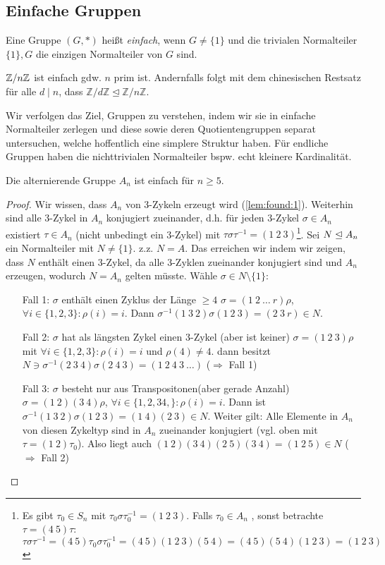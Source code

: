 \documentclass[../main.tex]{subfiles}
\begin{document}
\subsection{Einfache Gruppen}
\begin{definition}
Eine Gruppe $(G,*)$ heißt \emph{einfach}, wenn $G \neq \{1\}$ und die trivialen Normalteiler $\{1\}, G$ die einzigen Normalteiler von $G$ sind.
\end{definition}
\begin{example}
    $\mathbb{Z}/n\mathbb{Z}$ ist einfach gdw. $n$ prim ist. Andernfalls folgt mit dem chinesischen Restsatz für alle $d \mid n$, dass $\mathbb{Z}/d\mathbb{Z} \trianglelefteq \mathbb{Z}/n\mathbb{Z}$.
\end{example}
Wir verfolgen das Ziel, Gruppen zu verstehen, indem wir sie in einfache Normalteiler zerlegen und diese sowie deren Quotientengruppen separat untersuchen, welche hoffentlich eine simplere Struktur haben. Für endliche Gruppen haben die nichttrivialen Normalteiler bspw. echt kleinere Kardinalität.
\begin{theorem}[$A_5$]
Die alternierende Gruppe $A_n$ ist einfach für $n \geq 5$.
\end{theorem}
\begin{proof}
Wir wissen, dass $A_n$ von 3-Zykeln erzeugt wird (\cref{lem:found:1}).
Weiterhin sind alle 3-Zykel in $A_n$ konjugiert zueinander, d.h. für jeden 3-Zykel $\sigma \in A_n$ existiert $\tau \in A_n$ (nicht unbedingt ein 3-Zykel) mit $\tau\sigma\tau^{-1} = (1\ 2\ 3)$\footnote{Es gibt $\tau_0\in S_n$ mit $\tau_0\sigma\tau_0^{-1}=(1\ 2\ 3)$. Falls $\tau_0 \in A_n$ \checkmark, sonst betrachte $\tau = (4\ 5)\tau$: $\tau \sigma \tau^{-1} = (4\ 5)\tau_0\sigma\tau_0^{-1} =(4\ 5)(1\ 2\ 3)(5\ 4) = (4\ 5)(5\ 4)(1\ 2\ 3)=(1\ 2\ 3)$}.
Sei $N\trianglelefteq A_n$ ein Normalteiler mit $N\neq \{1\}$. z.z. $N=A$. Das erreichen wir indem wir zeigen, dass $N$ enthält einen $3$-Zykel, da alle $3$-Zyklen zueinander konjugiert sind und $A_n$ erzeugen, wodurch $N=A_n$ gelten müsste.
Wähle $\sigma \in N\setminus\{1\}$:
\begin{itemize}[font=\itshape,align= left]
    \item[Fall 1: $\sigma$ enthält einen Zyklus der Länge $\geq 4$] \obda $\sigma=(1\ 2\ \dots\ r) \rho$, $\forall i\in\{1,2,3\}:\rho(i)=i$. Dann $\sigma^{-1}(1\ 3\ 2)\sigma(1\ 2\ 3) = (2\ 3\ r)\in N$.
    \item[Fall 2: $\sigma$ hat als längsten Zykel einen 3-Zykel (aber ist keiner)] \obda $\sigma = (1\ 2\ 3)\rho$ mit $\forall i\in\{1,2,3\}:\rho(i)=i$ und $\rho(4)\neq 4$. dann besitzt $N\ni \sigma^{-1}(2\ 3\ 4)\sigma (2\ 4\ 3) = (1\ 2\ 4\ 3\ \dots)$ ($\Rightarrow$ Fall 1)
    \item[Fall 3: $\sigma$ besteht nur aus Transpositonen(aber gerade Anzahl)] \obda $\sigma = (1\ 2)(3\ 4)\rho$, $\forall i\in\{1,2,34,\}:\rho(i)=i$. Dann ist $\sigma^{-1}(1\ 3\ 2)\sigma(1\ 2\ 3)=(1\ 4)(2\ 3)\in N$. Weiter gilt: Alle Elemente in $A_n$ von diesen Zykeltyp sind in $A_n$ zueinander konjugiert (vgl. oben mit $\tau=(1\ 2)\tau_0$). Also liegt auch $(1\ 2)(3\ 4)(2\ 5) (3\ 4) = (1\ 2\ 5) \in N$ ($\Rightarrow$ Fall 2)
\end{itemize}

\end{proof}
\end{document}

